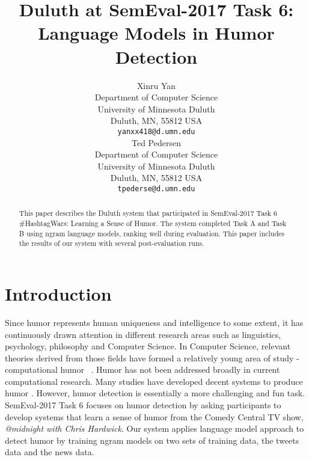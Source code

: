 \documentclass[11pt,a4paper]{article}
\title{Duluth at SemEval-2017 Task 6:  Language Models in Humor Detection}
\author{Xinru Yan \\
  Department of Computer Science \\ University of Minnesota Duluth \\ Duluth, MN, 55812 USA \\
  {\tt yanxx418@d.umn.edu} \\\And
  Ted Pedersen \\
  Department of Computer Science \\ University of Minnesota Duluth \\ Duluth, MN, 55812 USA \\
  {\tt tpederse@d.umn.edu} \\}
\date{}
\begin{document}
\maketitle
\begin{abstract}
  This paper describes the Duluth system that participated in SemEval-2017 Task 6 \#HashtagWars: Learning a Sense of Humor. The system completed Task A and Task B using ngram language models, ranking well during evaluation. This paper includes the results of our system with several post-evaluation runs. 
\end{abstract}

\section{Introduction}
Since humor represents human uniqueness and intelligence to some extent, it has continuously drawn attention in different research areas such as linguistics, psychology, philosophy and Computer Science. In Computer Science, relevant theories derived from those fields have formed a relatively young area of study - computational humor ~\cite{Recognizing:Humor:On:Twitter}. Humor has not been addressed broadly in current computational research. Many studies have developed decent systems to produce humor \cite{ozbal2012computational}. However, humor detection is essentially a more challenging and fun task. SemEval-2017 Task 6 focuses on humor detection by asking participants to develop systems that learn a sense of humor from the Comedy Central TV show, \textit{@midnight with Chris Hardwick}. Our system applies language model approach to detect humor by training ngram models on two sets of training data, the tweets data and the news data.\\
\end{document}
